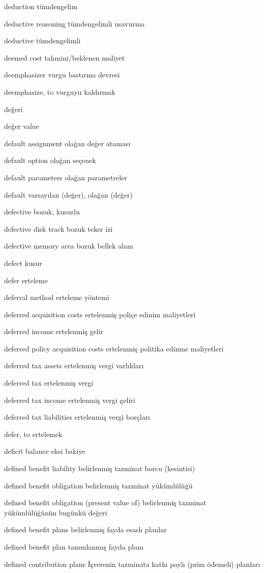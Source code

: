 \documentclass[12pt,fleqn]{article}\usepackage{../../common}
\begin{document}
deduction tümdengelim

deductive reasoning tümdengelimli usavurma

deductive tümdengelimli

deemed cost tahmini/beklenen maliyet

deemphasizer vurgu bastırma devresi

deemphasize, to vurguyu kaldırmak

değeri

değer value

default assignment olağan değer ataması

default option olağan seçenek

default parameters olağan parametreler

default varsayılan (değer), olağan (değer)

defective bozuk, kusurlu

defective disk track bozuk teker izi

defective memory area bozuk bellek alanı

defect kusur

defer erteleme

deferral method erteleme yöntemi

deferred acquisition costs ertelenmiş poliçe edinim maliyetleri

deferred income ertelenmiş gelir

deferred policy acquisition costs ertelenmiş politika edinme maliyetleri

deferred tax assets ertelenmiş vergi varlıkları

deferred tax ertelenmiş vergi

deferred tax income ertelenmiş vergi geliri

deferred tax liabilities ertelenmiş vergi borçları

defer, to ertelemek

deficit balance eksi bakiye

defined benefit liability belirlenmiş tazminat borcu (kesintisi)

defined benefit obligation belirlenmiş tazminat yükümlülüğü

defined benefit obligation (present value of) belirlenmiş tazminat yükümlülüğünün bugünkü değeri

defined benefit plans belirlenmiş fayda esaslı planlar

defined benefit plan tanımlanmış fayda planı

defined contribution plans İşverenin tazminata katkı paylı (prim ödemeli) planları
\end{document}
